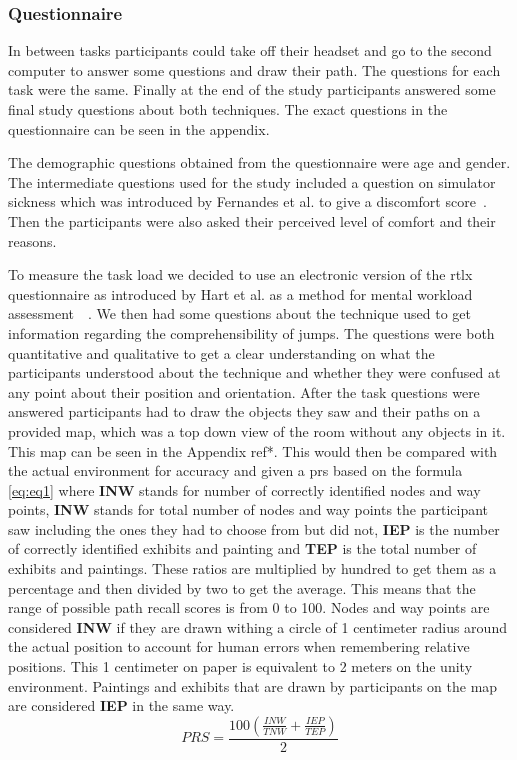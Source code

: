 \subsubsection{Questionnaire}
\label{subsubsection DPUS SP SP: User Feedback}
In between tasks participants could take off their headset and go to the second computer to answer some questions and draw their path. The questions for each task were the same. Finally at the end of the study participants answered some final study questions about both techniques. The exact questions in the questionnaire can be seen in the appendix.

The demographic questions obtained from the questionnaire were age and gender. The intermediate questions used for the study included a question on simulator sickness which was introduced by Fernandes et al. to give a discomfort score~\cite{Fernandes2016}. Then the participants were also asked their perceived level of comfort and their reasons.

To measure the task load we decided to use an electronic version of the \acrfull{rtlx} questionnaire as introduced by Hart et al. as a method for mental workload assessment~\cite{Hart1988}~\cite{Hart2006}. We then had some questions about the technique used to get information regarding the comprehensibility of jumps. The questions were both quantitative and qualitative to get a clear understanding on what the participants understood about the technique and whether they were confused at any point about their position and orientation. After the task questions were answered participants had to draw the objects they saw and their paths on a provided map, which was a top down view of the room without any objects in it. This map can be seen in the Appendix ref*. This would then be compared with the actual environment for accuracy and given a \acrfull{prs} based on the formula \ref{eq:eq1} where \textbf{INW} stands for number of correctly identified nodes and way points, \textbf{INW} stands for total number of nodes and way points the participant saw including the ones they had to choose from but did not, \textbf{IEP} is the number of correctly identified exhibits and painting and \textbf{TEP} is the total number of exhibits and paintings. These ratios are multiplied by hundred to get them as a percentage and then divided by two to get the average. This means that the range of possible path recall scores is from 0 to 100. Nodes and way points are considered \textbf{INW} if they are drawn withing a circle of 1 centimeter radius around the actual position to account for human errors when remembering relative positions. This 1 centimeter on paper is equivalent to 2 meters on the unity environment. Paintings and exhibits that are drawn by participants on the map are considered \textbf{IEP} in the same way. 
\begin{equation}
	\label{eq:eq1}
	PRS = \frac{100\left(\frac{INW}{TNW} + \frac{IEP}{TEP}\right)}{2}
\end{equation}


